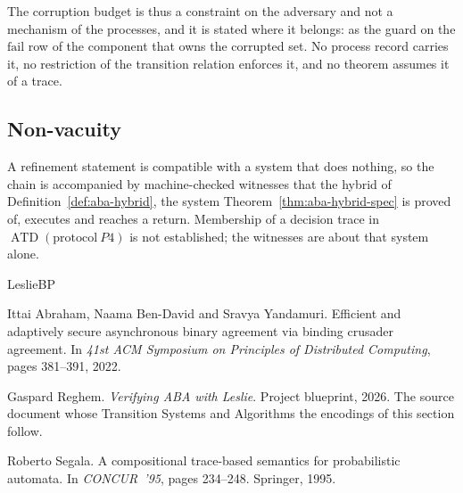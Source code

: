 



The corruption budget is thus a constraint on the adversary and not a mechanism
of the processes, and it is stated where it belongs: as the guard on the
$\mathrm{fail}$ row of the component that owns the corrupted set.
No process record carries it, no restriction of the transition relation enforces
it, and no theorem assumes it of a trace.

\subsection{Non-vacuity}

A refinement statement is compatible with a system that does nothing, so the
chain is accompanied by machine-checked witnesses that the hybrid of
Definition~\ref{def:aba-hybrid}, the system
Theorem~\ref{thm:aba-hybrid-spec} is proved of, executes and reaches a
return.
Membership of a decision trace in
$\operatorname{ATD}(\mathrm{protocol}\ P4)$ is not established; the
witnesses are about that system alone.



\begin{thebibliography}{LeslieBP}

Ittai Abraham, Naama Ben-David and Sravya Yandamuri.
Efficient and adaptively secure asynchronous binary agreement via binding
crusader agreement.
In \emph{41st ACM Symposium on Principles of Distributed Computing}, pages
381--391, 2022.

Gaspard Reghem.
\emph{Verifying ABA with Leslie}.
Project blueprint, 2026.
The source document whose Transition Systems and Algorithms the encodings of
this section follow.

Roberto Segala.
A compositional trace-based semantics for probabilistic automata.
In \emph{CONCUR~'95}, pages 234--248. Springer, 1995.

\end{thebibliography}
